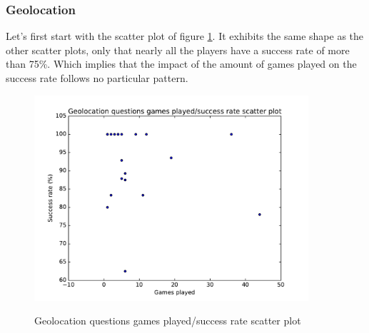 \subsubsection{Geolocation}\label{subsec:geolocissue}
Let's first start with the scatter plot of figure \ref{fig:geoScatter}. It exhibits the same shape as the other scatter plots, only that nearly all the players have a success rate of more than 75\%. Which implies that the impact of the amount of games played on the success rate follows no particular pattern.

\begin{figure}
\centering
{\includegraphics[width=4in]{images/geo_scatter.pdf}}
\caption{Geolocation questions games played/success rate scatter plot}
\label{fig:geoScatter}
\end{figure}

